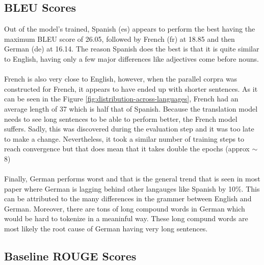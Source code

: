 \documentclass[12pt,a4paper,twoside,openright]{report}
\begin{document}
\subsection{BLEU Scores}

Out of the model's trained, Spanish (es) appears to perform the best having the maximum BLEU score of 26.05, followed by French (fr) at 18.85 and then German (de) at 16.14. The reason Spanish does the best is that it is quite similar to English, having only a few major differences like adjectives come before nouns. \\\\
French is also very close to English, however, when the parallel corpra was constructed for French, it appears to have ended up with shorter sentences. As it can be seen in the Figure \ref{fig:distribution-across-languages}, French had an average length of 37 which is half that of Spanish. Because the translation model needs to see long sentences to be able to perform better, the French model suffers. Sadly, this was discovered during the evaluation step and it was too late to make a change. Nevertheless, it took a similar number of training steps to reach convergence but that does mean that it takes double the epochs (approx $\sim$ 8) \\\\
Finally, German performs worst and that is the general trend that is seen in most paper where German is lagging behind other langauges like Spanish by 10\%.  This can be attributed to the many differences in the grammer between English and German. Moreover, there are tons of long compound words in German which would be hard to tokenize in a meaninful way. These long compund words are most likely the root cause of German having very long sentences. 



\subsection{Baseline ROUGE Scores}
\end{document}
